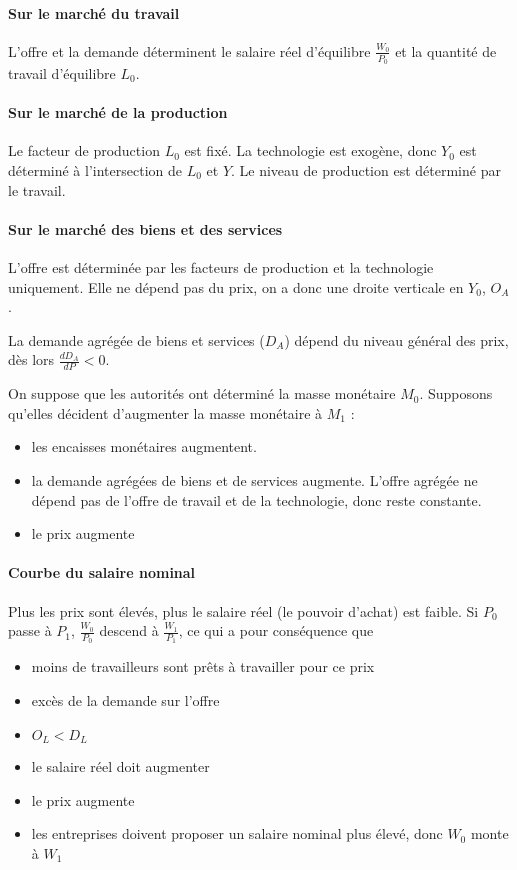 	
	\paragraph{Sur le marché du travail} L'offre et la demande déterminent le salaire réel d'équilibre $\frac{W_0}{P_0}$ et la quantité de travail d'équilibre $L_0$.
	
	\paragraph{Sur le marché de la production} Le facteur de production $L_0$ est fixé. La technologie est exogène, donc $Y_0$ est déterminé à l'intersection de $L_0$ et $Y$. Le niveau de production est déterminé par le travail.
	
	\paragraph{Sur le marché des biens et des services} L'offre est déterminée par les facteurs de production et la technologie uniquement. Elle ne dépend pas du prix, on a donc une droite verticale en $Y_0$, $O_A$.
	
	La demande agrégée de biens et services ($D_A$) dépend du niveau général des prix, dès lors $\frac{dD_A}{dP} < 0$.
	
	On suppose que les autorités ont déterminé la masse monétaire $M_0$. Supposons qu'elles décident d'augmenter la masse monétaire à $M_1$ :
	
	\begin{itemize}
		\item les encaisses monétaires augmentent.
		\item la demande agrégées de biens et de services augmente. L'offre agrégée ne dépend pas de l'offre de travail et de la technologie, donc reste constante.
		\item le prix augmente
	\end{itemize}
	
	
	\paragraph{Courbe du salaire nominal}
	
	Plus les prix sont élevés, plus le salaire réel (le pouvoir d'achat) est faible. Si $P_0$ passe à $P_1$, $\frac{W_0}{P_0}$ descend à $\frac{W_1}{P_1}$, ce qui a pour conséquence que
	
	\begin{itemize}
		\item moins de travailleurs sont prêts à travailler pour ce prix
		\item excès de la demande sur l'offre
		\item $O_L < D_L$
		\item le salaire réel doit augmenter
		\item le prix augmente
		\item les entreprises doivent proposer un salaire nominal plus élevé, donc $W_0$ monte à $W_1$
	\end{itemize}
	
